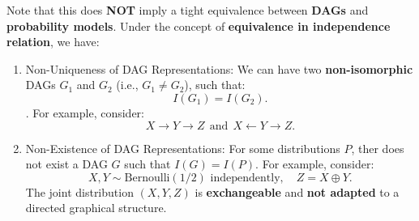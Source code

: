 \documentclass{article}%
\begin{document}
Note that this does \textbf{NOT} imply a tight equivalence between \textbf{DAGs} and \textbf{probability models}. Under the concept of \textbf{equivalence in independence relation}, we have:
\begin{enumerate}
    \item Non-Uniqueness of DAG Representations: We can have two \textbf{non-isomorphic} DAGs \( G_1 \) and \( G_2 \) (i.e., \( G_1 \neq G_2 \)), such that:
    \[
    I(G_1) = I(G_2).
    \]. For example, consider:
    \[
    X \rightarrow Y \rightarrow Z\ \  \text{and} \ \ X \leftarrow Y \rightarrow Z.
    \]
    \item Non-Existence of DAG Representations: For some distributions \( P \), ther does not exist a DAG \( G \) such that \( I(G) = I(P) \). For example, consider:
    \[
    X, Y \sim \text{Bernoulli}(1/2) \text{ independently}, \quad Z = X \oplus Y.
    \]
    The joint distribution \( (X, Y, Z) \) is \textbf{exchangeable} and \textbf{not adapted} to a directed graphical structure.
\end{enumerate}
\end{document}
